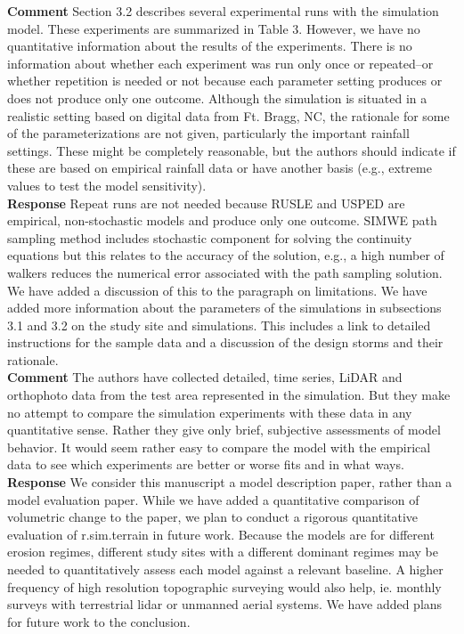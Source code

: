 \documentclass[gmd, manuscript]{copernicus}
\begin{document}
\noindent\textbf{Comment}
Section 3.2 describes several experimental runs with the simulation model. These experiments are summarized in Table 3. However, we have no quantitative information about the results of the experiments. There is no information about whether each experiment was run only once or repeated–or whether repetition is needed or not because each parameter setting produces or does not produce only one outcome. Although the simulation is situated in a realistic setting based on digital data from Ft. Bragg, NC, the rationale for some of the parameterizations are not given, particularly the important rainfall settings. These might be completely reasonable, but the authors should indicate if these are based on empirical rainfall data or have another basis (e.g., extreme values to test the model sensitivity).
\\

\noindent\textbf{Response}
Repeat runs are not needed because RUSLE and USPED are empirical, non-stochastic models and produce only one outcome. SIMWE path sampling method includes stochastic component for solving the continuity equations but this relates to the accuracy of the solution,  e.g., a high number of walkers reduces the numerical error associated with the path sampling solution. We have added a discussion of this to the paragraph on limitations. We have added more information about the parameters of the simulations in subsections 3.1 and 3.2 on the study site and simulations. This includes a link to detailed instructions for the sample data and a discussion of the design storms and their rationale. 
\\

\noindent\textbf{Comment}
The authors have collected detailed, time series, LiDAR and orthophoto data from the test area represented in the simulation. But they make no attempt to compare the simulation experiments with these data in any quantitative sense. Rather they give only brief, subjective assessments of model behavior. It would seem rather easy to compare the model with the empirical data to see which experiments are better or worse fits and in what ways.
\\

\noindent\textbf{Response}
 We consider this manuscript  a model description paper, rather than a model evaluation paper. While we have added a quantitative comparison of volumetric change to the paper, we plan to conduct a rigorous quantitative evaluation of r.sim.terrain in future work. Because the models are for different erosion regimes, different study sites  with a different dominant regimes may be needed to quantitatively assess each model against a relevant baseline. A higher frequency of high resolution topographic surveying would also help, ie. monthly surveys with terrestrial lidar or unmanned aerial systems. We have added plans for future work to the conclusion.
\\
\end{document}
